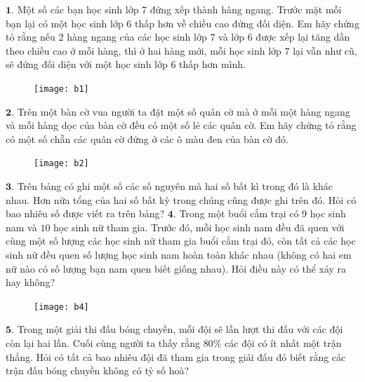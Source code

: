 \begin{multicols}{2}
	$\pmb{1.}$	Một số các bạn học sinh lớp $7$ đứng xếp  thành hàng ngang. Trước mặt mỗi bạn lại có một học sinh lớp $6$ thấp hơn về chiều cao đứng đối diện. Em hãy chứng tỏ rằng nếu $2$ hàng ngang của các học sinh lớp $7$ và lớp $6$ được xếp lại tăng dần theo chiều cao ở mỗi hàng, thì ở hai hàng mới, mỗi học sinh lớp $7$ lại vẫn như cũ, sẽ đứng đối diện với một học sinh lớp $6$ thấp hơn mình.
	\begin{figure}[H]
		\vspace*{-5pt}
		\centering
		\captionsetup{labelformat= empty, justification=centering}
		\texttt{[image: b1]}
		\vspace*{-15pt}
	\end{figure}
	$\pmb{2.}$	Trên một bàn cờ vua người ta đặt một số quân cờ mà ở  mỗi một hàng ngang và mỗi hàng dọc của bàn cờ đều có một số lẻ các quân cờ. Em hãy chứng tỏ rằng có một số chẵn các quân cờ đứng ở các ô màu đen của bàn cờ đó.
	\begin{figure}[H]
		\vspace*{-5pt}
		\centering
		\captionsetup{labelformat= empty, justification=centering}
		\texttt{[image: b2]}
		\vspace*{-15pt}
	\end{figure}
	$\pmb{3.}$	Trên bảng có ghi một số các số nguyên mà hai số bất kì trong đó là khác nhau.  Hơn nữa tổng của hai số bất kỳ trong chúng cũng được ghi trên đó. Hỏi có bao nhiêu số được viết ra trên bảng?
	\vskip 0.1cm
	$\pmb{4.}$	Trong một buổi cắm trại có $9$ học sinh nam và $10$ học sinh nữ tham gia. Trước đó, mỗi học sinh nam đều đã quen với cùng một số lượng các học sinh nữ tham gia buổi cắm trại đó, còn tất cả các học sinh nữ đều quen số lượng học sinh nam hoàn toàn khác nhau (không có hai em nữ nào có số lượng bạn nam quen biết giống nhau). Hỏi điều này có thể xảy ra hay không?
	\begin{figure}[H]
		\vspace*{-5pt}
		\centering
		\captionsetup{labelformat= empty, justification=centering}
		\texttt{[image: b4]}
		\vspace*{-15pt}
	\end{figure}
	$\pmb{5.}$	Trong một giải thi đấu bóng chuyền, mỗi đội sẽ lần lượt thi đấu với các đội còn lại hai lần. Cuối cùng người ta thấy rằng $80\%$ các đội có ít nhất một trận thắng. Hỏi có tất cả bao nhiêu đội đã tham gia trong giải đấu đó biết rằng các trận đấu bóng chuyền không có tỷ số hoà?
	\begin{figure}[H]
		\vspace*{-5pt}

\end{figure}
\end{multicols}
